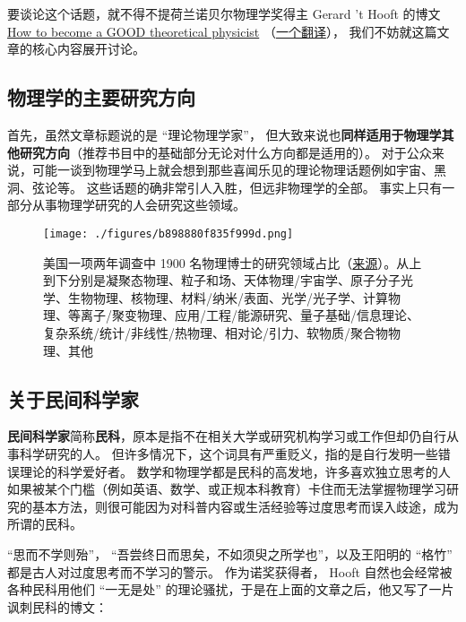
要谈论这个话题，就不得不提荷兰诺贝尔物理学奖得主 Gerard 't Hooft 的博文 \href{https://webspace.science.uu.nl/~hooft101/theorist.html}{How to become a GOOD theoretical physicist} （\href{https://xialab.pku.edu.cn/kytdyw1/zdylm.m.jsp?wbtreeid=1011&tstreeid=11956&_t_uid=2945&language=en&homepageuuid=BF649325C5584FC683CE0B601D21AC65&templateuuid=4CC182410BA14FF8B55ED726FB2087FB&producttype=0&_tmode_=99&tsitesapptype=zdylm}{一个翻译}）， 我们不妨就这篇文章的核心内容展开讨论。

\subsection{物理学的主要研究方向}
首先，虽然文章标题说的是 “理论物理学家”， 但大致来说也\textbf{同样适用于物理学其他研究方向}（推荐书目中的基础部分无论对什么方向都是适用的）。 对于公众来说，可能一谈到物理学马上就会想到那些喜闻乐见的理论物理话题例如宇宙、黑洞、弦论等。 这些话题的确非常引人入胜，但远非物理学的全部。 事实上只有一部分从事物理学研究的人会研究这些领域。

\begin{figure}[ht]
\centering
\texttt{[image: ./figures/b898880f835f999d.png]}
\caption{美国一项两年调查中 1900 名物理博士的研究领域占比（\href{https://ww2.aip.org/statistics/trends-in-physics-phds}{来源}）。从上到下分别是凝聚态物理、粒子和场、天体物理/宇宙学、原子分子光学、生物物理、核物理、材料/纳米/表面、光学/光子学、计算物理、等离子/聚变物理、应用/工程/能源研究、量子基础/信息理论、复杂系统/统计/非线性/热物理、相对论/引力、软物质/聚合物物理、其他} \label{fig_SdyPhy_1}
\end{figure}

\subsection{关于民间科学家}
\textbf{民间科学家}简称\textbf{民科}，原本是指不在相关大学或研究机构学习或工作但却仍自行从事科学研究的人。 但许多情况下，这个词具有严重贬义，指的是自行发明一些错误理论的科学爱好者。 数学和物理学都是民科的高发地，许多喜欢独立思考的人如果被某个门槛（例如英语、数学、或正规本科教育）卡住而无法掌握物理学习研究的基本方法，则很可能因为对科普内容或生活经验等过度思考而误入歧途，成为所谓的民科。

“思而不学则殆”， “吾尝终日而思矣，不如须臾之所学也”，以及王阳明的 “格竹” 都是古人对过度思考而不学习的警示。 作为诺奖获得者， Hooft 自然也会经常被各种民科用他们 “一无是处” 的理论骚扰，于是在上面的文章之后，他又写了一片讽刺民科的博文：

